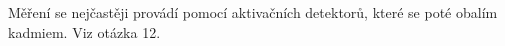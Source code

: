 Měření se nejčastěji provádí pomocí aktivačních detektorů, které se poté obalím kadmiem. Viz otázka 12.

